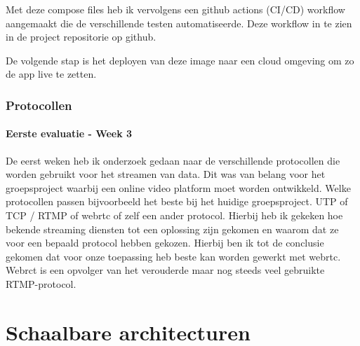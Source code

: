 Met deze compose files heb ik vervolgens een github actions (CI/CD) workflow aangemaakt die de verschillende testen automatiseerde.
Deze workflow in te zien in de project repositorie op github.

De volgende stap is het deployen van deze image naar een cloud omgeving om zo de app live te zetten.

\subsubsection{Protocollen}\label{subsec:protocollen}
\paragraph{Eerste evaluatie - Week 3}
De eerst weken heb ik onderzoek gedaan naar de verschillende protocollen die worden gebruikt voor het streamen van data.
Dit was van belang voor het groepsproject waarbij een online video platform moet worden ontwikkeld.
Welke protocollen passen bijvoorbeeld het beste bij het huidige groepsproject.
UTP of TCP / RTMP of webrtc of zelf een ander protocol.
Hierbij heb ik gekeken hoe bekende streaming diensten tot een oplossing zijn gekomen en waarom dat ze voor een
bepaald protocol hebben gekozen.
Hierbij ben ik tot de conclusie gekomen dat voor onze toepassing heb beste kan worden gewerkt met webrtc.
Webrct is een opvolger van het verouderde maar nog steeds veel gebruikte RTMP-protocol.










\newpage
\section{Schaalbare architecturen}\label{sec:schaalbare-architecturen}


